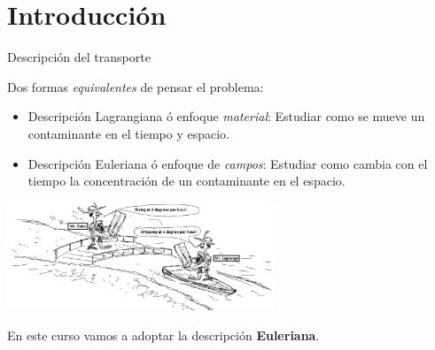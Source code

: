 \subtitle{Emiiones en rellenos sanitarios}
\begin{frame}
  \titlepage
\end{frame}

\section{Introducción}

\begin{frame}{Descripción del transporte}


Dos formas \textit{equivalentes} de pensar el problema: 
\begin{itemize}
    \item Descripción \alert{Lagrangiana} ó enfoque \textit{material}: Estudiar como se mueve un contaminante en el tiempo y espacio.
    
    \item Descripción \alert{Euleriana} ó enfoque de \textit{campos}: Estudiar como cambia con el tiempo la concentración de un contaminante en el espacio.
    
\end{itemize}

\begin{center}
    \includegraphics[width=0.6\textwidth]{img/MaterialDerivative.png}
\end{center}

En este curso vamos a adoptar la descripción \textbf{Euleriana}.
    
\end{frame}
